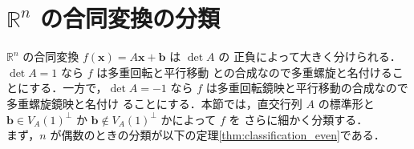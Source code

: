 \documentclass[11pt, uplatex, dvipdfmx, titlepage]{jsarticle}
\theoremstyle{definition}
\begin{document}
\newpage

\section{$\mathbb{R}^n$ の合同変換の分類}\label{sec:classification}

$\mathbb{R}^n$ の合同変換 $f(\bm{x}) = A\bm{x} + \bm{b}$ は $\det A$ の
正負によって大きく分けられる．$\det A=1$ なら $f$ は多重回転と平行移動
との合成なので多重螺旋と名付けることにする．一方で，$\det
A=-1$ なら $f$ は多重回転鏡映と平行移動の合成なので多重螺旋鏡映と名付け
ることにする．本節では，直交行列 $A$ の標準形と $\bm{b} \in
V_A(1)^{\perp}$ か $\bm{b} \not\in V_A(1)^{\perp}$ かによって $f$ を
さらに細かく分類する．\\

まず，$n$ が偶数のときの分類が以下の定理\ref{thm:classification_even}である．
\end{document}
